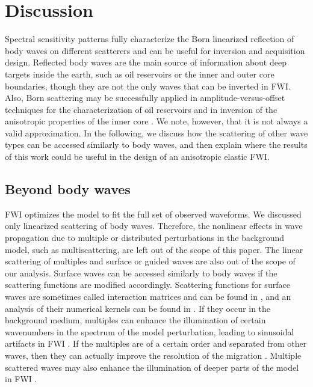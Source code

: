 \section{Discussion}
Spectral sensitivity patterns fully characterize the Born linearized reflection of body waves on different scatterers and can be useful for inversion and acquisition design. Reflected body waves are the main source of information about deep targets inside the earth, such as oil reservoirs or the inner and outer core boundaries, though they are not the only waves that can be inverted in FWI.
Also, Born scattering may be successfully applied in amplitude-versus-offset techniques for the characterization of oil reservoirs \citep{beretta2002,shaw2006,boer2018} and in inversion of the anisotropic properties of the inner core \citep{vidale2000}. We note, however, that it is not always a valid approximation. 
%
In the following, we discuss how the scattering of other wave types can be accessed similarly to body waves, and then explain where the results of this work could be useful in the design of an anisotropic elastic FWI.

\subsection{Beyond body waves}
FWI optimizes the model to fit the full set of observed waveforms. We discussed only linearized scattering of body waves. Therefore, the nonlinear effects in wave propagation due to multiple or distributed perturbations in the background model, such as multiscattering, are left out of the scope of this paper. The linear scattering of multiples and surface or guided waves are also out of the scope of our analysis. Surface waves can be accessed similarly to body waves if the scattering functions are modified accordingly. Scattering functions for surface waves are sometimes called interaction matrices and can be found in \citep{snieder1986}, and an analysis of their numerical kernels can be found in \citep{sieminski2007}. If they occur in the background medium, multiples can enhance the illumination of certain wavenumbers in the spectrum of the model perturbation, leading to sinusoidal artifacts in FWI \citep{kazei2013spectral,kazei2015seg}. If the multiples are of a certain order and separated from other waves, then they can actually improve the resolution of the migration \citep{schuster2014}. Multiple scattered waves may also enhance the illumination of deeper parts of the model in FWI \citep{alkhalifah2014}.
%

